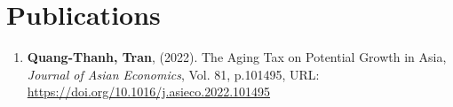 \section{\sc Publications}
\begin{enumerate}
\item
  {\bf Quang-Thanh, Tran},
  (2022).
  {The Aging Tax on Potential Growth in Asia},
  {\it Journal of Asian Economics}, Vol. 81, p.101495,
  {URL: \url{https://doi.org/10.1016/j.asieco.2022.101495}}
\end{enumerate}


